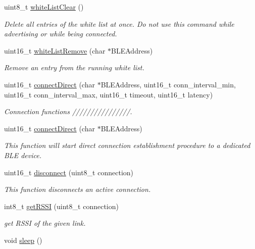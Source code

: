 \begin{DoxyCompactItemize}
uint8\+\_\+t \hyperlink{class_wasp_b_l_e_a8c04876be117113fc1d5ca8ae4279981}{white\+List\+Clear} ()
\begin{DoxyCompactList}\small\item\em Delete all entries of the white list at once. Do not use this command while advertising or while being connected. \end{DoxyCompactList}\item 
uint16\+\_\+t \hyperlink{class_wasp_b_l_e_a3b8283aac0a9c5beaa60a95080cb1cba}{white\+List\+Remove} (char $\ast$B\+L\+E\+Address)
\begin{DoxyCompactList}\small\item\em Remove an entry from the running white list. \end{DoxyCompactList}\item 
uint16\+\_\+t \hyperlink{class_wasp_b_l_e_a0cc38431b7b969985d4d7fc6911c42bb}{connect\+Direct} (char $\ast$B\+L\+E\+Address, uint16\+\_\+t conn\+\_\+interval\+\_\+min, uint16\+\_\+t conn\+\_\+interval\+\_\+max, uint16\+\_\+t timeout, uint16\+\_\+t latency)
\begin{DoxyCompactList}\small\item\em Connection functions ////////////////. \end{DoxyCompactList}\item 
uint16\+\_\+t \hyperlink{class_wasp_b_l_e_a11199da23e76a89d43d97a760b95ad10}{connect\+Direct} (char $\ast$B\+L\+E\+Address)
\begin{DoxyCompactList}\small\item\em This function will start direct connection establishment procedure to a dedicated B\+LE device. \end{DoxyCompactList}\item 
uint16\+\_\+t \hyperlink{class_wasp_b_l_e_a33cee3ca711119d5744b656e3616271a}{disconnect} (uint8\+\_\+t connection)
\begin{DoxyCompactList}\small\item\em This function disconnects an active connection. \end{DoxyCompactList}\item 
int8\+\_\+t \hyperlink{class_wasp_b_l_e_ac67e786947c84ecb3dd2a953a097c6b1}{get\+R\+S\+SI} (uint8\+\_\+t connection)
\begin{DoxyCompactList}\small\item\em get R\+S\+SI of the given link. \end{DoxyCompactList}\item 
void \hyperlink{class_wasp_b_l_e_a1cf5d8cf6b265fe516f4a00f2699f5ac}{sleep} ()

\end{DoxyCompactItemize}
